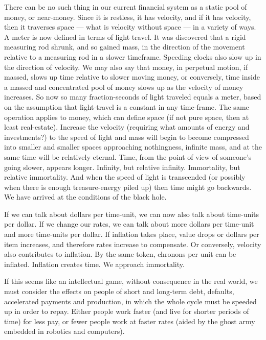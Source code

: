 \documentclass[11pt,twoside,draft]{memoir}
\begin{document}
There can be no such thing in our current
financial system as a static pool of money, or
near-money. Since it is restless, it has velocity, and if it has velocity, then it traverses
space --- what is velocity without space --- in a
variety of ways. A meter is now defined in
terms of light travel. It was discovered that a
rigid measuring rod shrunk, and so gained
mass, in the direction of the movement relative to a measuring rod in a slower timeframe. Speeding clocks also slow up in the
direction of velocity. We may also say that money,
in perpetual motion, if massed,
slows up time relative to slower moving
money, or conversely, time inside a massed
and concentrated pool of money slows up as
the velocity of money increases. So now
so many fraction-seconds of light traveled
equals a meter, based on the assumption that
light-travel is a constant in any time-frame.
The same operation applies to money, which
can define space (if not pure space, then at
least real-estate). Increase the velocity (requiring what amounts of energy and investments?) to the speed of light and mass will
begin to become compressed into smaller
and smaller spaces approaching nothingness,
infinite mass, and at the same time will be
relatively eternal. Time, from the point of
view of someone's going slower, appears
longer. Infinity, but relative infinity. Immortality, but relative immortality. And when
the speed of light is transcended (or possibly
when there is enough treasure-energy piled
up) then time might go backwards. We have
arrived at the conditions of the black hole.

If we can talk about dollars per time-unit,
we can now also talk about time-units per
dollar. If we change our rates, we can talk
about more dollars per time-unit and more
time-units per dollar. If inflation takes place,
value drops or dollars per item increases,
and therefore rates increase to compensate.
Or conversely, velocity also contributes to
inflation. By the same token, chronons per
unit can be inflated. Inflation creates time.
We approach immortality.

If this seems like an intellectual game,
without consequence in the real world, we
must consider the effects on people of short
and long-term debt, defaults, accelerated
payments and production, in which the
whole cycle must be speeded up in order to
repay. Either people work faster (and live for
shorter periods of time) for less pay, or fewer
people work at faster rates (aided by the
ghost army embedded in robotics and computers).
\end{document}
